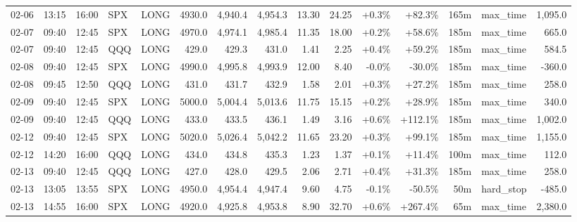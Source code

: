 \documentclass[11pt,a4paper,twoside]{article}
\begin{document}
\begin{landscape}
\begin{center}
\begin{longtable}{>{\color{txtmain}}l l l l l r r r r r r r r >{\color{txtmain}}l r}
02-06 & 13:15 & 16:00 & SPX & LONG & 4930.0 & 4,940.4 & 4,954.3 & 13.30 & 24.25 & \textcolor{wingreen}{+0.3\%} & \textcolor{wingreen}{+82.3\%} & 165m & max\_time & \textcolor{wingreen}{1,095.0} \\
02-07 & 09:40 & 12:45 & SPX & LONG & 4970.0 & 4,974.1 & 4,985.4 & 11.35 & 18.00 & \textcolor{wingreen}{+0.2\%} & \textcolor{wingreen}{+58.6\%} & 185m & max\_time & \textcolor{wingreen}{665.0} \\
02-07 & 09:40 & 12:45 & QQQ & LONG & 429.0 & 429.3 & 431.0 & 1.41 & 2.25 & \textcolor{wingreen}{+0.4\%} & \textcolor{wingreen}{+59.2\%} & 185m & max\_time & \textcolor{wingreen}{584.5} \\
02-08 & 09:40 & 12:45 & SPX & LONG & 4990.0 & 4,995.8 & 4,993.9 & 12.00 & 8.40 & \textcolor{lossred}{-0.0\%} & \textcolor{lossred}{-30.0\%} & 185m & max\_time & \textcolor{lossred}{-360.0} \\
02-08 & 09:45 & 12:50 & QQQ & LONG & 431.0 & 431.7 & 432.9 & 1.58 & 2.01 & \textcolor{wingreen}{+0.3\%} & \textcolor{wingreen}{+27.2\%} & 185m & max\_time & \textcolor{wingreen}{258.0} \\
02-09 & 09:40 & 12:45 & SPX & LONG & 5000.0 & 5,004.4 & 5,013.6 & 11.75 & 15.15 & \textcolor{wingreen}{+0.2\%} & \textcolor{wingreen}{+28.9\%} & 185m & max\_time & \textcolor{wingreen}{340.0} \\
02-09 & 09:40 & 12:45 & QQQ & LONG & 433.0 & 433.5 & 436.1 & 1.49 & 3.16 & \textcolor{wingreen}{+0.6\%} & \textcolor{wingreen}{+112.1\%} & 185m & max\_time & \textcolor{wingreen}{1,002.0} \\
02-12 & 09:40 & 12:45 & SPX & LONG & 5020.0 & 5,026.4 & 5,042.2 & 11.65 & 23.20 & \textcolor{wingreen}{+0.3\%} & \textcolor{wingreen}{+99.1\%} & 185m & max\_time & \textcolor{wingreen}{1,155.0} \\
02-12 & 14:20 & 16:00 & QQQ & LONG & 434.0 & 434.8 & 435.3 & 1.23 & 1.37 & \textcolor{wingreen}{+0.1\%} & \textcolor{wingreen}{+11.4\%} & 100m & max\_time & \textcolor{wingreen}{112.0} \\
02-13 & 09:40 & 12:45 & QQQ & LONG & 427.0 & 428.0 & 429.5 & 2.06 & 2.71 & \textcolor{wingreen}{+0.4\%} & \textcolor{wingreen}{+31.3\%} & 185m & max\_time & \textcolor{wingreen}{258.0} \\
02-13 & 13:05 & 13:55 & SPX & LONG & 4950.0 & 4,954.4 & 4,947.4 & 9.60 & 4.75 & \textcolor{lossred}{-0.1\%} & \textcolor{lossred}{-50.5\%} & 50m & hard\_stop & \textcolor{lossred}{-485.0} \\
02-13 & 14:55 & 16:00 & SPX & LONG & 4920.0 & 4,925.8 & 4,953.8 & 8.90 & 32.70 & \textcolor{wingreen}{+0.6\%} & \textcolor{wingreen}{+267.4\%} & 65m & max\_time & \textcolor{wingreen}{2,380.0} \\

\end{longtable}
\end{center}
\end{landscape}
\end{document}
